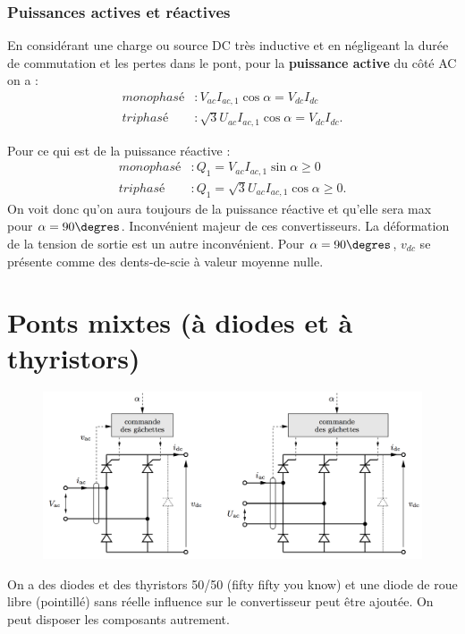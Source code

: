 					\subsubsection{Puissances actives et réactives}
						En considérant une charge ou source DC très inductive et en négligeant la durée de commutation et les pertes dans le pont, pour la \textbf{puissance active} du côté AC on a :
						\begin{equation}
						\begin{aligned}
						monophasé &: V_{ac}I_{ac,1}\cos \alpha = V_{dc}I_{dc}\\
						triphasé &: \sqrt{3}U_{ac}I_{ac,1}\cos \alpha = V_{dc}I_{dc}.
						\end{aligned}
						\end{equation}

						Pour ce qui est de la puissance réactive : 
						\begin{equation}
						\begin{aligned}
						monophasé &: Q_1 = V_{ac}I_{ac,1}\sin \alpha \geq 0\\
						triphasé &: Q_1 = \sqrt{3}U_{ac}I_{ac,1}\cos \alpha \geq 0.
						\end{aligned}
						\end{equation}
						On voit donc qu'on aura toujours de la puissance réactive et qu'elle sera max pour $\alpha = 90\degres$. Inconvénient majeur de ces convertisseurs. La déformation de la tension de sortie est un autre inconvénient. Pour $\alpha = 90\degres$, $v_{dc}$ se présente comme des dents-de-scie à valeur moyenne nulle. 
						
	\section{Ponts mixtes (à diodes et à thyristors)}
		\begin{figure}
		\vspace{-5mm}
		\includegraphics[scale=0.28]{ch3/10}
		\end{figure}
		On a des diodes et des thyristors 50/50 (fifty fifty you know) et une diode de roue libre (pointillé) sans réelle influence sur le convertisseur peut être ajoutée. On peut disposer les composants autrement. \\
		
